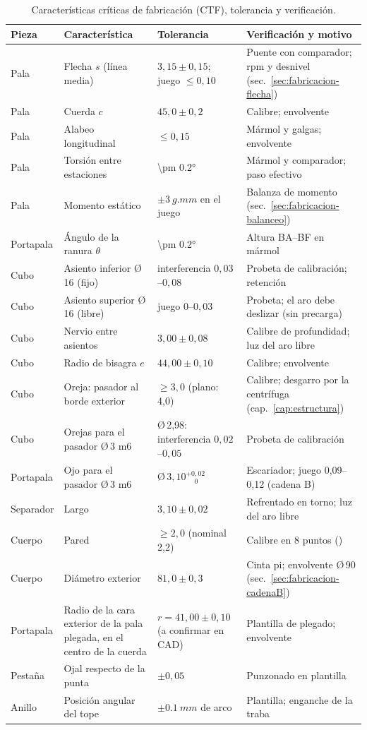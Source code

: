 \begin{table}[H]
\centering\small
\caption{Características críticas de fabricación (CTF), tolerancia y verificación.}
\label{tab:fabricacion-ctf}
\begin{tabularx}{\textwidth}{@{}lY>{\raggedright\arraybackslash}p{3.6cm}Y@{}}
\toprule
\textbf{Pieza} & \textbf{Característica} & \textbf{Tolerancia} & \textbf{Verificación y motivo}\\\midrule
Pala & Flecha $s$ (línea media) & $3{,}15\pm0{,}15$; juego $\le0{,}10$ & Puente con comparador; rpm y desnivel (sec.~\ref{sec:fabricacion-flecha})\\
Pala & Cuerda $c$ & $45{,}0\pm0{,}2$ & Calibre; envolvente\\
Pala & Alabeo longitudinal & $\le0{,}15$ & Mármol y galgas; envolvente\\
Pala & Torsión entre estaciones & \ang{\pm 0.2} & Mármol y comparador; paso efectivo\\
Pala & Momento estático & $\pm\SI{3}{g.mm}$ en el juego & Balanza de momento (sec.~\ref{sec:fabricacion-balanceo})\\
Portapala & Ángulo de la ranura $\theta$ & \ang{\pm 0.2} & Altura BA--BF en mármol\\
Cubo & Asiento inferior Ø\,16 (fijo) & interferencia $0{,}03$--$0{,}08$ & Probeta de calibración; retención\\
Cubo & Asiento superior Ø\,16 (libre) & juego $0$--$0{,}03$ & Probeta; el aro debe deslizar (sin precarga)\\
Cubo & Nervio entre asientos & $3{,}00\pm0{,}08$ & Calibre de profundidad; luz del aro libre\\
Cubo & Radio de bisagra $e$ & $44{,}00\pm0{,}10$ & Calibre; envolvente\\
Cubo & Oreja: pasador al borde exterior & $\ge3{,}0$ (plano: 4,0) & Calibre; desgarro por la centrífuga (cap.~\ref{cap:estructura})\\
Cubo & Orejas para el pasador Ø\,3 m6 & Ø\,2,98: interferencia $0{,}02$--$0{,}05$ & Probeta de calibración\\
Portapala & Ojo para el pasador Ø\,3 m6 & Ø\,$3{,}10^{+0{,}02}_{\phantom{+}0}$ & Escariador; juego 0,09--0,12 (cadena B)\\
Separador & Largo & $3{,}10\pm0{,}02$ & Refrentado en torno; luz del aro libre\\
Cuerpo & Pared & $\ge2{,}0$ (nominal 2,2) & Calibre en 8 puntos ()\\
Cuerpo & Diámetro exterior & $81{,}0\pm0{,}3$ & Cinta pi; envolvente Ø\,90 (sec.~\ref{sec:fabricacion-cadenaB})\\
Portapala & Radio de la cara exterior de la pala plegada, en el centro de la cuerda & $r=41{,}00\pm0{,}10$ (a confirmar en CAD) & Plantilla de plegado; envolvente\\
Pestaña & Ojal respecto de la punta & $\pm0{,}05$ & Punzonado en plantilla\\
Anillo & Posición angular del tope & $\pm\SI{0.1}{mm}$ de arco & Plantilla; enganche de la traba\\
\bottomrule
\end{tabularx}
\end{table}


